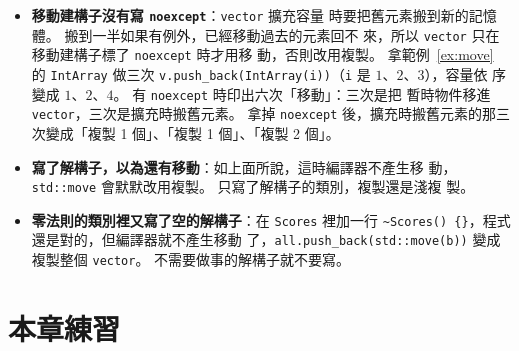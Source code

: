 \begin{itemize}
\item \textbf{移動建構子沒有寫 \texttt{noexcept}}：\texttt{vector} 擴充容量
時要把舊元素搬到新的記憶體。 搬到一半如果有例外，已經移動過去的元素回不
來，所以 \texttt{vector} 只在移動建構子標了 \texttt{noexcept} 時才用移
動，否則改用複製。 拿範例~\ref{ex:move} 的 \texttt{IntArray} 做三次
\texttt{v.push\_back(IntArray(i))}（\texttt{i} 是 $1$、$2$、$3$），容量依
序變成 $1$、$2$、$4$。 有 \texttt{noexcept} 時印出六次「移動」：三次是把
暫時物件移進 \texttt{vector}，三次是擴充時搬舊元素。 拿掉
\texttt{noexcept} 後，擴充時搬舊元素的那三次變成「複製 1 個」、「複製 1
個」、「複製 2 個」。
\item \textbf{寫了解構子，以為還有移動}：如上面所說，這時編譯器不產生移
動，\texttt{std::move} 會默默改用複製。 只寫了解構子的類別，複製還是淺複
製。
\item \textbf{零法則的類別裡又寫了空的解構子}：在 \texttt{Scores} 裡加一行
\texttt{\textasciitilde Scores() \{\}}，程式還是對的，但編譯器就不產生移動
了，\texttt{all.push\_back(std::move(b))} 變成複製整個 \texttt{vector}。
不需要做事的解構子就不要寫。
\end{itemize}

\section{本章練習}
\label{sec:ch6-exercises}

